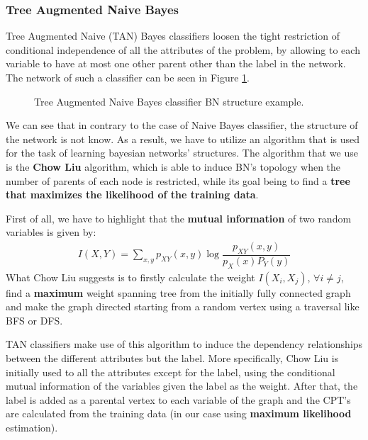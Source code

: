 \documentclass[11pt]{article}
\begin{document}
	\subsubsection{Tree Augmented Naive Bayes \label{sec:tan_naive_bayes}}
	Tree Augmented Naive (TAN) Bayes classifiers loosen the tight restriction of conditional independence of all the attributes of the problem, by allowing to each variable to have at most one other parent other than the label in the network. The network of such a classifier can be seen in Figure \ref{fig:tan_net}.
	
	\begin{figure}[H]
		\caption{Tree Augmented Naive Bayes classifier BN structure example.}
		\label{fig:tan_net}
	\end{figure}
	We can see that in contrary to the case of Naive Bayes classifier, the structure of the network is not know. As a result, we have to utilize an algorithm that is used for the task of learning bayesian networks' structures. The algorithm that we use is the \textbf{Chow Liu} algorithm, which is able to induce BN's topology when the number of parents of each node is restricted, while its goal being to find a \textbf{tree that maximizes the likelihood of the training data}.
	\par
	First of all, we have to highlight that the \textbf{mutual information} of two random variables is given by:
	\begin{align*}
		I(X,Y) = \sum_{x,y}p_{XY}(x,y)\log\dfrac{p_{XY}(x,y)}{p_X(x)P_Y(y)}
	\end{align*}
	What Chow Liu suggests is to firstly calculate the weight $I(X_i, X_j)$, $\forall i \neq j$, find a \textbf{maximum} weight spanning tree from the initially fully connected graph and make the graph directed starting from a random vertex using a traversal like BFS or DFS.
	\par
	TAN classifiers make use of this algorithm to induce the dependency relationships between the different attributes but the label. More specifically, Chow Liu is initially used to all the attributes except for the label, using the conditional mutual information of the variables given the label as the weight. After that, the label is added as a parental vertex to each variable of the graph and the CPT's are calculated from the training data (in our case using \textbf{maximum likelihood} estimation).
\end{document}
